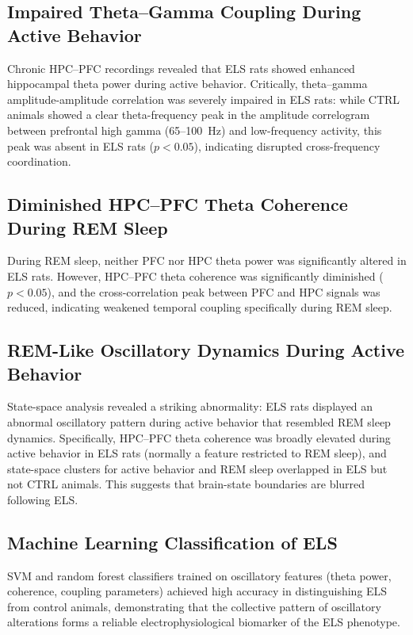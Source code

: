 \documentclass[11pt]{article}
\begin{document}
\subsection{Impaired Theta--Gamma Coupling During Active Behavior}

Chronic HPC--PFC recordings revealed that ELS rats showed enhanced hippocampal theta power during active behavior. Critically, theta--gamma amplitude-amplitude correlation was severely impaired in ELS rats: while CTRL animals showed a clear theta-frequency peak in the amplitude correlogram between prefrontal high gamma (65--100~Hz) and low-frequency activity, this peak was absent in ELS rats ($p < 0.05$), indicating disrupted cross-frequency coordination.

\subsection{Diminished HPC--PFC Theta Coherence During REM Sleep}

During REM sleep, neither PFC nor HPC theta power was significantly altered in ELS rats. However, HPC--PFC theta coherence was significantly diminished ($p < 0.05$), and the cross-correlation peak between PFC and HPC signals was reduced, indicating weakened temporal coupling specifically during REM sleep.

\subsection{REM-Like Oscillatory Dynamics During Active Behavior}

State-space analysis revealed a striking abnormality: ELS rats displayed an abnormal oscillatory pattern during active behavior that resembled REM sleep dynamics. Specifically, HPC--PFC theta coherence was broadly elevated during active behavior in ELS rats (normally a feature restricted to REM sleep), and state-space clusters for active behavior and REM sleep overlapped in ELS but not CTRL animals. This suggests that brain-state boundaries are blurred following ELS.

\subsection{Machine Learning Classification of ELS}

SVM and random forest classifiers trained on oscillatory features (theta power, coherence, coupling parameters) achieved high accuracy in distinguishing ELS from control animals, demonstrating that the collective pattern of oscillatory alterations forms a reliable electrophysiological biomarker of the ELS phenotype.
\end{document}
